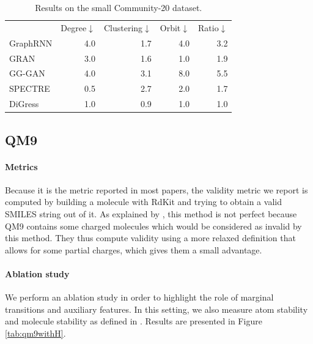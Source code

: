 \documentclass{article} %
\theoremstyle{plain}
\theoremstyle{definition}
\theoremstyle{remark}
\begin{document}
\begin{table}[t]
    \centering
    \caption{Results on the small Community-20 dataset.}
    \begin{tabular}{l r r r r}
    \toprule
         & Degree$\downarrow$ & Clustering$\downarrow$ & Orbit$\downarrow$ & Ratio$\downarrow$ \\
    GraphRNN & 4.0 & 1.7 & 4.0 & 3.2 \\
    GRAN & 3.0 & 1.6 & 1.0 & 1.9 \\
    GG-GAN & 4.0 & 3.1 & 8.0 & 5.5 \\
    SPECTRE & 0.5 & 2.7 & 2.0 & 1.7 \\
    DiGress & 1.0 & 0.9 & 1.0 & 1.0 \\
    \bottomrule
    \end{tabular}
    \label{tab:comm20}
\end{table}

\subsection{QM9}

\paragraph{Metrics}

Because it is the metric reported in most papers, the validity metric we report is computed by building a molecule with RdKit and trying to obtain a valid SMILES string out of it. As explained by \citet{jo2022score}, this method is not perfect because QM9 contains some charged molecules which would be considered as invalid by this method. They thus compute validity using a more relaxed definition that allows for some partial charges, which gives them a small advantage. 

\paragraph{Ablation study}
We perform an ablation study in order to highlight the role of marginal transitions and auxiliary features. 
In this setting, we also measure atom stability and molecule stability as defined in \citep{hoogeboom2022equivariant}. Results are presented in Figure \ref{tab:qm9withH}. 
\end{document}
